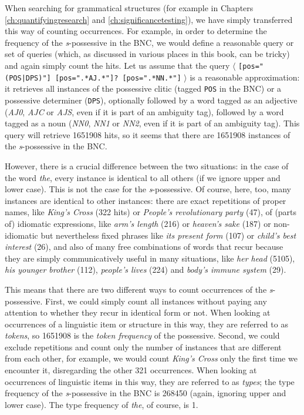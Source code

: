 When searching for grammatical structures (for example in Chapters \ref{ch:quantifyingresearch} and \ref{ch:significancetesting}), we have simply transferred this way of counting occurrences. For example, in order to determine the frequency of the \textit{s}-possessive in the BNC, we would define a reasonable query or set of queries (which, as discussed in various places in this book, can be tricky) and again simply count the hits. Let us assume that the query $\langle$ \texttt{[pos="(POS|DPS)"] [pos=".*AJ.*"]? [pos=".*NN.*"]} $\rangle$ is a reasonable approximation: it retrieves all instances of the possessive clitic (tagged \texttt{POS} in the BNC) or a possessive determiner (\texttt{DPS}), optionally followed by a word tagged as an adjective (\textit{AJ0}, \textit{AJC} or \textit{AJS}, even if it is part of an ambiguity tag), followed by a word tagged as a noun (\textit{NN0}, \textit{NN1} or \textit{NN2}, even if it is part of an ambiguity tag). This query will retrieve \num{1651908} hits, so it seems that there are \num{1651908} instances of the \textit{s}-possessive in the BNC.

However, there is a crucial difference between the two situations: in the case of the word \textit{the}, every instance is identical to all others (if we ignore upper and lower case). This is not the case for the \textit{s}-possessive. Of course, here, too, many instances are identical to other instances: there are exact repetitions of proper names, like \textit{King's Cross} (322 hits) or \textit{People's revolutionary party} (47), of (parts of) idiomatic expressions, like \textit{arm's length} (216) or \textit{heaven's sake} (187) or non-idiomatic but nevertheless fixed phrases like \textit{its present form} (107) or \textit{child's best interest} (26), and also of many free combinations of words that recur because they are simply communicatively useful in many situations, like \textit{her head} (5105), \textit{his younger brother} (112), \textit{people's lives} (224) and \textit{body's immune system} (29).

This means that there are two different ways to count occurrences of the \textit{s}-possessive. First, we could simply count all instances without paying any attention to whether they recur in identical form or not. When looking at occurrences of a linguistic item or structure in this way, they are referred to as \textit{tokens}, so \num{1651908} is the \textit{token frequency} of the possessive. Second, we could exclude repetitions and count only the number of instances that are different from each other, for example, we would count \textit{King's Cross} only the first time we encounter it, disregarding the other 321 occurrences. When looking at occurrences of linguistic items in this way, they are referred to as \textit{types}; the type frequency of the \textit{s}-possessive in the BNC is \num{268450} (again, ignoring upper and lower case). The type frequency of \textit{the}, of course, is 1. 

